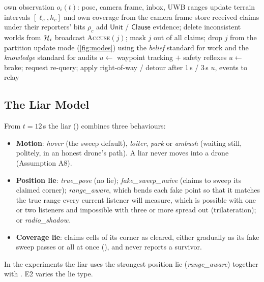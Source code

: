 \begin{algorithm}[t]
\caption{One decision step of gated drone $i$ (simplified)}
\label{alg:decide}
\begin{algorithmic}[1]
\Require own observation $o_i(t)$: pose, camera frame, inbox, UWB ranges
\State update terrain intervals $[\ell_c,h_c]$ and own coverage from the camera frame
\State store received claims under their reporters' bits $\rho_c$
    \State add $\mathsf{Unit}$ / $\mathsf{Clause}$ evidence; delete inconsistent worlds from $\mathcal{H}_i$
\EndFor
{} \State broadcast \textsc{Accuse}$(j)$; mask $j$ out of all claims; drop $j$ from the partition \EndIf
\State update mode (\autoref{fig:modes}) using the \emph{belief} standard for work and the \emph{knowledge} standard for audits
\State $u\gets$ waypoint tracking $+$ safety reflexes 
 
    \State $u\gets$ brake; request re-query; apply right-of-way / detour after 1\,s / 3\,s
\EndIf
\State \Return $u$, events to relay
\end{algorithmic}
\end{algorithm}

\subsection{The Liar Model}

From $t=12$\,s the liar () combines three behaviours:
\begin{itemize}
    \item \textbf{Motion}: \emph{hover} (the sweep default), \emph{loiter}, \emph{park} or \emph{ambush} (waiting
          still, politely, in an honest drone's path). A liar never moves into a drone (Assumption A8).
    \item \textbf{Position lie}: \emph{true\_pose} (no lie); \emph{fake\_sweep\_naive} (claims to sweep its claimed
          corner); \emph{range\_aware}, which bends each fake point so that it matches the true range every current
          listener will measure, which is possible with one or two listeners and impossible with three or more spread
          out (trilateration); or \emph{radio\_shadow}.
    \item \textbf{Coverage lie}: claims cells of its corner as cleared, either gradually as its fake sweep passes or
          all at once (), and never reports a survivor.
\end{itemize}
In the experiments the liar uses the strongest position lie (\emph{range\_aware}) together with . E2 varies
the lie type.

